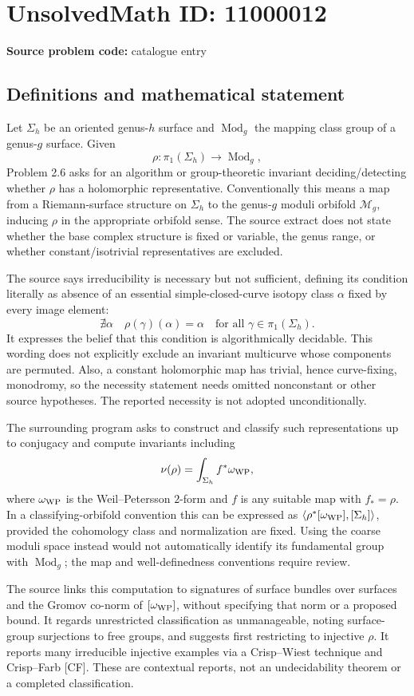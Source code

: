 \documentclass[11pt]{article}
\begin{document}
\section*{UnsolvedMath ID: 11000012}
\textbf{Source problem code:} catalogue entry
\subsection{Definitions and mathematical statement}
Let \(\Sigma_h\) be an oriented genus-\(h\) surface and \(\operatorname{Mod}_g\) the mapping class group of a genus-\(g\) surface. Given
\[
 \rho:\pi_1(\Sigma_h)\longrightarrow\operatorname{Mod}_g,
\]
Problem 2.6 asks for an algorithm or group-theoretic invariant deciding/detecting whether \(\rho\) has a holomorphic representative. Conventionally this means a map from a Riemann-surface structure on \(\Sigma_h\) to the genus-\(g\) moduli orbifold \(\mathcal M_g\), inducing \(\rho\) in the appropriate orbifold sense. The source extract does not state whether the base complex structure is fixed or variable, the genus range, or whether constant/isotrivial representatives are excluded.

The source says irreducibility is necessary but not sufficient, defining its condition literally as absence of an essential simple-closed-curve isotopy class \(\alpha\) fixed by every image element:
\[
 \nexists\alpha\quad
 \rho(\gamma)(\alpha)=\alpha\quad\text{for all }\gamma\in\pi_1(\Sigma_h).
\]
It expresses the belief that this condition is algorithmically decidable. This wording does not explicitly exclude an invariant multicurve whose components are permuted. Also, a constant holomorphic map has trivial, hence curve-fixing, monodromy, so the necessity statement needs omitted nonconstant or other source hypotheses. The reported necessity is not adopted unconditionally.

The surrounding program asks to construct and classify such representations up to conjugacy and compute invariants including
\[
 \nu(\rho)=\int_{\Sigma_h} f^*\omega_{\rm WP},
\]
where \(\omega_{\rm WP}\) is the Weil--Petersson \(2\)-form and \(f\) is any suitable map with \(f_*=\rho\). In a classifying-orbifold convention this can be expressed as \(\langle\rho^*[\omega_{\rm WP}],[\Sigma_h]\rangle\), provided the cohomology class and normalization are fixed. Using the coarse moduli space instead would not automatically identify its fundamental group with \(\operatorname{Mod}_g\); the map and well-definedness conventions require review.

The source links this computation to signatures of surface bundles over surfaces and the Gromov co-norm of \([\omega_{\rm WP}]\), without specifying that norm or a proposed bound. It regards unrestricted classification as unmanageable, noting surface-group surjections to free groups, and suggests first restricting to injective \(\rho\). It reports many irreducible injective examples via a Crisp--Wiest technique and Crisp--Farb [CF]. These are contextual reports, not an undecidability theorem or a completed classification.
\end{document}
